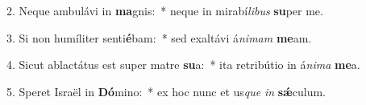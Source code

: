 2. Neque ambulávi in \textbf{ma}gnis:~*  neque in mirabí\textit{li}\textit{bus} \textbf{su}per me.\

3. Si non humíliter senti\textbf{é}bam:~*  sed exaltávi á\textit{ni}\textit{mam} \textbf{me}am.\

4. Sicut ablactátus est super matre \textbf{su}a:~*  ita retribútio in á\textit{ni}\textit{ma} \textbf{me}a.\

5. Speret Israël in \textbf{Dó}mino:~*  ex hoc nunc et us\textit{que} \textit{in} \textbf{sǽ}culum.\


